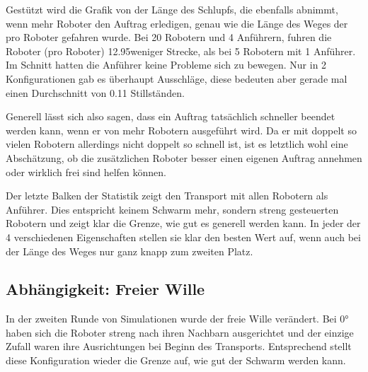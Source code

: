 Gestützt wird die Grafik von der Länge des Schlupfs, die ebenfalls abnimmt, wenn mehr Roboter den Auftrag erledigen, genau wie die Länge des Weges der pro Roboter gefahren wurde. Bei 20 Robotern und 4 Anführern, fuhren die Roboter (pro Roboter) 12.95\per weniger Strecke, als bei 5 Robotern mit 1 Anführer.
Im Schnitt hatten die Anführer keine Probleme sich zu bewegen. Nur in 2 Konfigurationen gab es überhaupt Ausschläge, diese bedeuten aber gerade mal einen Durchschnitt von 0.11 Stillständen.

Generell lässt sich also sagen, dass ein Auftrag tatsächlich schneller beendet werden kann, wenn er von mehr Robotern ausgeführt wird. Da er mit doppelt so vielen Robotern allerdings nicht doppelt so schnell ist, ist es letztlich wohl eine Abschätzung, ob die zusätzlichen Roboter besser einen eigenen Auftrag annehmen oder wirklich frei sind helfen können.

Der letzte Balken der Statistik zeigt den Transport mit allen Robotern als Anführer. Dies entspricht keinem Schwarm mehr, sondern streng gesteuerten Robotern und zeigt klar die Grenze, wie gut es generell werden kann. In jeder der 4 verschiedenen Eigenschaften stellen sie klar den besten Wert auf, wenn auch bei der Länge des Weges nur ganz knapp zum zweiten Platz.

\subsection*{Abhängigkeit: Freier Wille}

In der zweiten Runde von Simulationen wurde der freie Wille verändert. Bei 0° haben sich die Roboter streng nach ihren Nachbarn ausgerichtet und der einzige Zufall waren ihre Ausrichtungen bei Beginn des Transports. Entsprechend stellt diese Konfiguration wieder die Grenze auf, wie gut der Schwarm werden kann.


